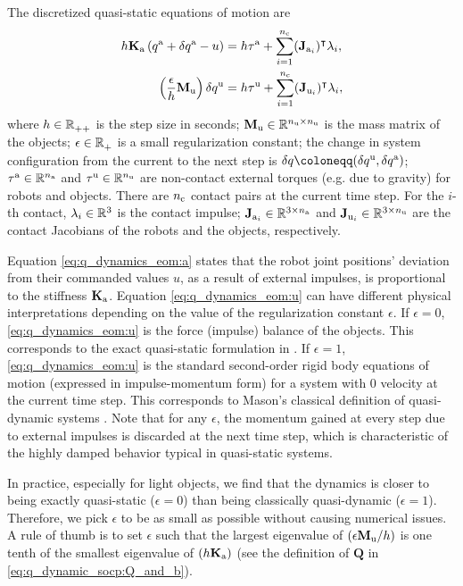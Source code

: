 The discretized quasi-static equations of motion are
\begin{subequations}
\label{eq:q_dynamics_eom}
\begin{align} 
h \Ka \left(\qa + \dqa - u \right) &= h\tauA + \sum_{i=1}^{\nC} (\Ja[i])^\intercal \lambda_i, \label{eq:q_dynamics_eom:a}\\
\left( \frac{\epsilon}{h} \Mu \right) \dqu &= h\tauU + \sum_{i=1}^{\nC} (\Ju[i])^\intercal \lambda_i, \label{eq:q_dynamics_eom:u}
\end{align}
\end{subequations}
where $h \in \R_{++}$ is the step size in seconds; $\Mu \in \R[\nU \times \nU]$ is the mass matrix of the objects; $\epsilon \in \R_{+}$ is a small regularization constant; the change in system configuration from the current to the next step is $\dq \coloneqq (\dqu, \dqa)$; $\tauA \in \R[\nA]$ and $\tauU \in \R[\nU]$ are non-contact external torques (e.g. due to gravity) for robots and objects. There are $\nC$ contact pairs at the current time step. For the $i$-th contact, $\lambda_i \in \R[3]$ is the contact impulse; $\Ja[i] \in \R[3 \times \nA]$ and $\Ju[i] \in \R[3 \times \nU]$ are the contact Jacobians \cite{anitescu1996formulating} of the robots and the objects, respectively.

Equation \eqref{eq:q_dynamics_eom:a} states that the robot joint positions' deviation from their commanded values $u$, as a result of external impulses, is proportional to the stiffness $\Ka$. 
Equation \eqref{eq:q_dynamics_eom:u} can have different physical interpretations depending on the value of the regularization constant $\epsilon$.
If $\epsilon = 0$, \eqref{eq:q_dynamics_eom:u} is the force (impulse) balance of the objects. This corresponds to the exact quasi-static formulation in  \cite{pang2021convex}. 
If $\epsilon = 1$, \eqref{eq:q_dynamics_eom:u} is the standard second-order rigid body equations of motion (expressed in impulse-momentum form) for a system with 0 velocity at the current time step. 
This corresponds to Mason's classical definition of quasi-dynamic systems \cite{mason2001mechanics}. 
Note that for any $\epsilon$, the momentum gained at every step due to external impulses is discarded at the next time step, which is characteristic of the highly damped behavior typical in quasi-static systems.

In practice, especially for light objects, we find that the dynamics is closer to being exactly quasi-static ($\epsilon = 0$) than being classically quasi-dynamic ($\epsilon = 1$). Therefore, we pick $\epsilon$ to be as small as possible without causing numerical issues. A rule of thumb is to set $\epsilon$ such that the largest eigenvalue of $(\epsilon \Mu / h)$ is one tenth of the smallest eigenvalue of $(h \Ka)$ (see the definition of $\mathbf{Q}$ in \eqref{eq:q_dynamic_socp:Q_and_b}).

